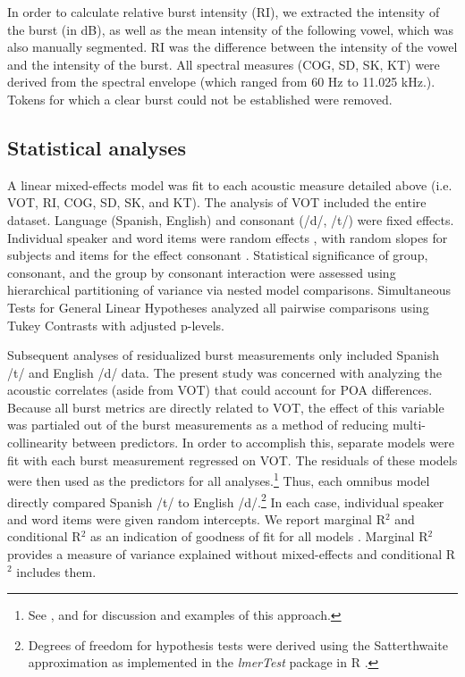 \documentclass[a4paper,11pt,twocolumn]{article}
\begin{document}
In order to calculate relative burst intensity (RI), we extracted the intensity of the burst (in dB), as well as the mean intensity of the following vowel, which was also manually segmented. RI was the difference between the intensity of the vowel and the intensity of the burst. All spectral measures (COG, SD, SK, KT) were derived from the spectral envelope (which ranged from 60 Hz to 11.025 kHz.). Tokens for which a clear burst could not be established were removed.

\subsection{Statistical analyses}

A linear mixed-effects model was fit to each acoustic measure detailed above (i.e. VOT, RI, COG, SD, SK, and KT). The analysis of VOT included the entire dataset. Language (Spanish, English) and consonant (/d/, /t/) were fixed effects. Individual speaker and word items were random effects \cite{Baayen:2008bd}, with random slopes for subjects and items for the effect consonant \cite{Barr:2013eh}. Statistical significance of group, consonant, and the group by consonant interaction were assessed using hierarchical partitioning of variance via nested model comparisons. Simultaneous Tests for General Linear Hypotheses analyzed all pairwise comparisons using Tukey Contrasts with adjusted
p-levels.

Subsequent analyses of residualized burst measurements only included Spanish /t/ and English /d/ data. The present study was concerned with analyzing the acoustic correlates (aside from VOT) that could account for POA differences. Because all burst metrics are directly related to VOT, the effect of this variable was partialed out of the burst measurements as a method of reducing multi-collinearity between predictors. In order to accomplish this, separate models were fit with each burst measurement regressed on VOT. The residuals of these models were then used as the predictors for all analyses.\footnote{See \cite{fowler1984segmentation}, \cite{gow2003feature} and \cite{McMurray:2010ep} for discussion and examples of this approach.} Thus, each omnibus model directly compared Spanish /t/ to English /d/.\footnote{Degrees of freedom for hypothesis tests were derived using the Satterthwaite approximation as implemented in the \emph{lmerTest} package in R \cite{rcitation}.} In each case, individual speaker and word items were given random intercepts. We report marginal R$^2$ and conditional R$^2$ as an indication of goodness of fit for all models \cite{Nakagawa2013}. Marginal R$^2$ provides a measure of variance explained without mixed-effects and conditional R$^2$ includes them.
\end{document}

